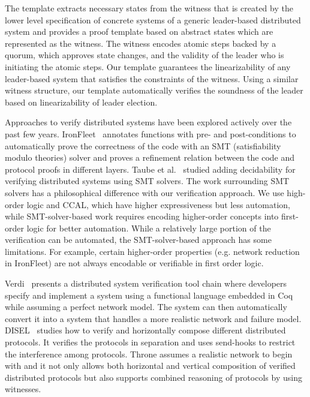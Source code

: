 The template extracts
necessary states from the witness that is created by the lower level
specification of concrete systems
of a generic leader-based distributed system and provides a proof template based on
abstract states which are represented as the witness.
The witness encodes atomic steps backed by a quorum, which approves state
changes, and the validity of the leader who is initiating the atomic steps.
Our template guarantees the linearizability of any leader-based system that
satisfies the constraints of the witness. Using a similar witness structure, our
template automatically verifies the soundness of the leader based on
linearizability of leader election.

Approaches to verify distributed systems have been explored actively over the
past few years. IronFleet~\cite{ironfleet} annotates functions with pre- and
post-conditions to automatically prove the correctness of the code with an SMT (satisfiability
modulo theories) solver and proves a refinement relation between the code and
protocol proofs in different layers. Taube et al.~\cite{modular} studied adding
decidability for verifying distributed systems using SMT solvers.
The work surrounding SMT solvers has a philosophical difference with our verification approach.
We use high-order logic and CCAL, which have higher expressiveness but less automation,
while SMT-solver-based work requires encoding higher-order concepts into
first-order logic for better automation. While a relatively large portion of the
verification can be automated, the SMT-solver-based approach has some limitations.
For example, certain higher-order properties (e.g. network reduction
in IronFleet) are not always encodable or verifiable in first order logic.

Verdi~\cite{verdi} presents a distributed system verification tool chain
where developers specify and implement a system using a functional language
embedded in Coq while assuming a perfect network model. The system can then automatically convert
it into a system that handles a more realistic network and failure model. DISEL~\cite{disel}
studies how to verify and horizontally compose different distributed protocols.
It verifies the protocols in separation and uses send-hooks to restrict the
interference among protocols. Throne assumes a realistic network to begin with
and it not only allows both horizontal and vertical composition of verified distributed
protocols but also supports combined reasoning of protocols by using witnesses.
\vspace{-0.2em}

